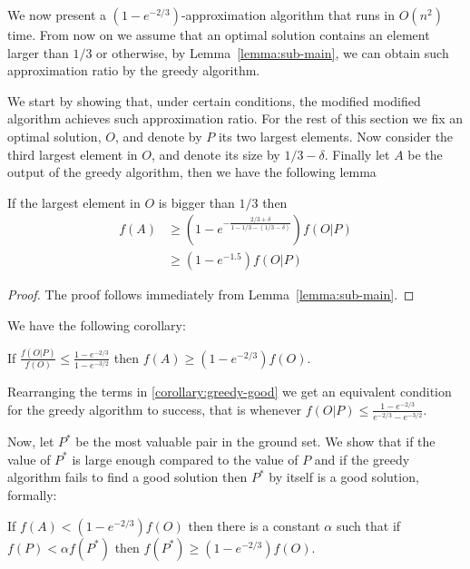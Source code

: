 We now present a $(1-e^{-2/3})$-approximation algorithm that runs in $O(n^2)$ time.
From now on we assume that an optimal solution contains an element larger than $1/3$ or otherwise, by Lemma~\ref{lemma:sub-main}, we can obtain such approximation ratio by the greedy algorithm.

We start by showing that,  under certain conditions, the modified modified algorithm achieves such approximation ratio.
For the rest of this section we fix an optimal solution, $O$, and denote by $P$ its two largest elements.
Now consider the third largest element in $O$, and denote its size by $1/3 - \delta$.
Finally let $A$ be the output of the greedy algorithm, then we have the following lemma

\begin{lemma}
	\label{eq:sub:greedy}
	If the largest element in $O$ is bigger than $1/3$ then
	\begin{align*}
		f(A) & \geq (1-e^{-\frac{2/3 + \delta}{1 - 1/3 - (1/3 - \delta)}})f(O|P)
		\\		& \geq (1 - e^{-1.5})f(O|P)
	\end{align*}
\end{lemma}

\begin{proof}
	The proof follows immediately from Lemma~\ref{lemma:sub-main}.
\end{proof}

We have the following corollary:
\begin{corollary}
	\label{corollary:greedy-good}
	If $\frac{f(O|P)}{f(O)} \leq \frac{1-e^{-2/3}}{1-e^{-3/2}}$ then $f(A) \geq (1 - e^{-2/3})f(O)$.
\end{corollary}

Rearranging the terms in \ref{corollary:greedy-good} we get an equivalent condition for the greedy algorithm to success, that is whenever $f(O|P) \leq \frac{1 - e^{-2/3}}{e^{-2/3} - e^{-3/2}}$.

Now, let $P^*$ be the most valuable pair in the ground set.
We show that if the value of $P^*$ is large enough compared to the value of $P$ and if the greedy algorithm fails to find a good solution then $P^*$ by itself is a good solution, formally:

\begin{lemma}
	\label{lemma:sub:alpha}
	If $f(A) < (1 - e^{-2/3})f(O)$ then there is a constant $\alpha$ such that if $f(P) < \alpha f(P^*)$ then $f(P^*) \geq (1 - e^{-2/3})f(O)$.
\end{lemma}

